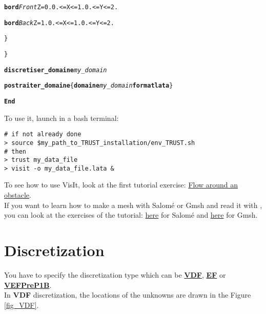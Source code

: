 \begin{center}
{\begin{minipage}[c]{0.8\textwidth}
\begin{alltt}
\hspace{2cm}        {\bf{bord}} \textit{Front}  \hspace{0.25cm} Z = 0. 0. <= X <= 1.  0. <= Y <= 2.

\hspace{2cm}        {\bf{bord}} \textit{Back}   \hspace{0.45cm} Z = 1. 0. <= X <= 1.  0. <= Y <= 2.

\hspace{1cm}    \}

\}

{\bf{discretiser\_domaine}} \textit{my\_domain}

{\bf{postraiter\_domaine}} \{ {\bf{domaine}} \textit{my\_domain} {\bf{format lata}} \}

{\bf{End}}
    \end{alltt}
\end{minipage}}
\end{center}

To use it, launch in a bash terminal:
\begin{verbatim}
# if not already done
> source $my_path_to_TRUST_installation/env_TRUST.sh
# then
> trust my_data_file
> visit -o my_data_file.lata &
\end{verbatim}

To see how to use VisIt, look at the first \trust tutorial exercise: \href{TRUST_tutorial.pdf\#exo1}{Flow around an obstacle}.\\

If you want to learn how to make a mesh with Salom\'e or Gmsh and read it with \trust, you can look at the exercises of the \trust tutorial: \href{TRUST_tutorial.pdf\#salome}{here} for Salom\'e and \href{TRUST_tutorial.pdf\#gmsh}{here} for Gmsh.







\section{Discretization}
You have to specify the discretization type which can be \href{\REFERENCEMANUAL\#vdf}{\textbf{VDF}}, \href{\REFERENCEMANUAL\#ef}{\textbf{EF}} or \href{\REFERENCEMANUAL\#vefprep1b}{\textbf{VEFPreP1B}}.\\

In \textbf{VDF} discretization, the locations of the unknowns are drawn in the Figure \ref{fig_VDF}.\\

